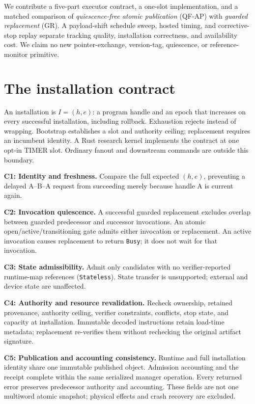 \documentclass{article}
\begin{document}
We contribute a five-part executor contract, a one-slot implementation, and a matched comparison of \emph{quiescence-free atomic publication} (QF-AP) with \emph{guarded replacement} (GR). A payload-shift schedule sweep, hosted timing, and corrective-stop replay separate tracking quality, installation correctness, and availability cost. We claim no new pointer-exchange, version-tag, quiescence, or reference-monitor primitive.

\section{The installation contract}
An installation is $I=(h,e)$: a program handle and an epoch that increases on every successful installation, including rollback. Exhaustion rejects instead of wrapping. Bootstrap establishes a slot and authority ceiling; replacement requires an incumbent identity. A Rust research kernel implements the contract at one opt-in TIMER slot. Ordinary fanout and downstream commands are outside this boundary.

\textbf{C1: Identity and freshness.} Compare the full expected $(h,e)$, preventing a delayed A--B--A request from succeeding merely because handle A is current again.

\textbf{C2: Invocation quiescence.} A successful guarded replacement excludes overlap between guarded predecessor and successor invocations. An atomic open/active/transitioning gate admits either invocation or replacement. An active invocation causes replacement to return \texttt{Busy}; it does not wait for that invocation.

\textbf{C3: State admissibility.} Admit only candidates with no verifier-reported runtime-map references (\texttt{Stateless}). State transfer is unsupported; external and device state are unaffected.

\textbf{C4: Authority and resource revalidation.} Recheck ownership, retained provenance, authority ceiling, verifier constraints, conflicts, stop state, and capacity at installation. Immutable decoded instructions retain load-time metadata; replacement re-verifies them without rechecking the original artifact signature.

\textbf{C5: Publication and accounting consistency.} Runtime and full installation identity share one immutable published object. Admission accounting and the receipt complete within the same serialized manager operation. Every returned error preserves predecessor authority and accounting. These fields are not one multiword atomic snapshot; physical effects and crash recovery are excluded.
\end{document}
